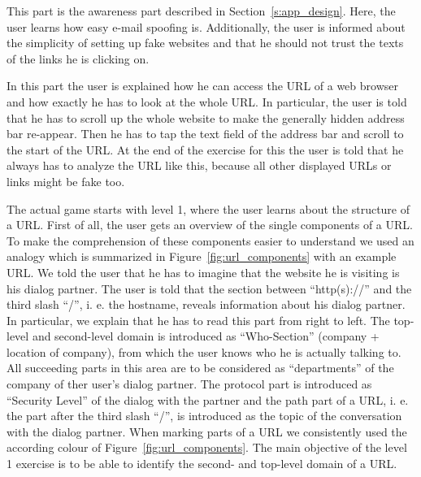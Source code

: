 \begin{description}[leftmargin=0cm]
	\item[Introduction 1] This part is the awareness part described in Section~\ref{s:app_design}. Here, the user learns how easy e-mail spoofing is.
 Additionally, the user is informed about the simplicity of setting up fake websites and that he should not trust the texts of the links he is clicking on.

	\item[Introduction 2] In this part the user is explained how he can access the URL of a web browser and how exactly he has to look at the whole URL.
 In particular, the user is told that he has to scroll up the whole website to make the generally hidden address bar re-appear.
 Then he has to tap the text field of the address bar and scroll to the start of the URL.
 At the end of the exercise for this the user is told that he always has to analyze the URL like this, because all other displayed URLs or links might be fake too.

	\item[Level 1] The actual game starts with level 1, where the user learns about the structure of a URL.
 First of all, the user gets an overview of the single components of a URL.
 To make the comprehension of these components easier to understand we used an analogy which is summarized in Figure~\ref{fig:url_components} with an example URL.
 We told the user that he has to imagine that the website he is visiting is his dialog partner.
 The user is told that the section between ``http(s)://'' and the third slash ``/'', i.
e.
 the hostname, reveals information about his dialog partner.
 In particular, we explain that he has to read this part from right to left.
 The top-level and second-level domain is introduced as ``Who-Section'' (company + location of company), from which the user knows who he is actually talking to.
 All succeeding parts in this area are to be considered as ``departments'' of the company of ther user's dialog partner.
 The protocol part is introduced as ``Security Level'' of the dialog with the partner and the path part of a URL, i.
e.
 the part after the third slash ``/'', is introduced as the topic of the conversation with the dialog partner.
 When marking parts of a URL we consistently used the according colour of Figure~\ref{fig:url_components}. The main objective of the level 1 exercise is to be able to identify the second- and top-level domain of a URL.


\end{description}
